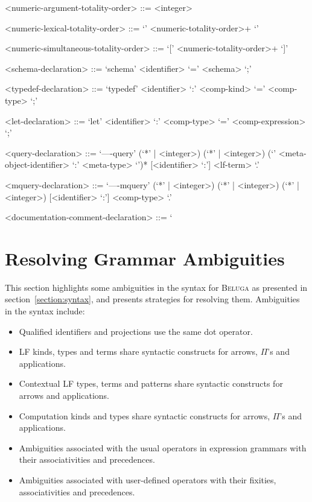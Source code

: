 \documentclass[11pt]{article}
\newcommand{\Beluga}{\textsc{Beluga}\xspace}
\newcommand{\LF}{\textsc{LF}\xspace}
\begin{document}
\begin{grammar}
<numeric-argument-totality-order> ::= <integer>

<numeric-lexical-totality-order> ::= `{' <numeric-totality-order>+ `}'

<numeric-simultaneous-totality-order> ::= `[' <numeric-totality-order>+ `]'

<schema-declaration> ::= `schema' <identifier> `=' <schema> `;'

<typedef-declaration> ::= `typedef' <identifier> `:' <comp-kind> `=' <comp-type> `;'

<let-declaration> ::= `let' <identifier> `:' <comp-type> `=' <comp-expression> `;'

<query-declaration> ::= `----query' (`*' | <integer>) (`*' | <integer>) (`{' <meta-object-identifier> `:' <meta-type> `}')* [<identifier> `:'] <lf-term> `.'

<mquery-declaration> ::= `----mquery' (`*' | <integer>) (`*' | <integer>) (`*' | <integer>) [<identifier> `:'] <comp-type> `.'

<documentation-comment-declaration> ::= `%
\end{grammar}

\section{Resolving Grammar Ambiguities}\label{section:resolving-grammar-ambiguities}

This section highlights some ambiguities in the syntax for \Beluga as presented in section~\ref{section:syntax}, and presents strategies for resolving them.
Ambiguities in the syntax include:
\begin{itemize}
\item Qualified identifiers and projections use the same dot operator.
\item \LF kinds, types and terms share syntactic constructs for arrows, $ \Pi $'s and applications.
\item Contextual \LF types, terms and patterns share syntactic constructs for arrows and applications.
\item Computation kinds and types share syntactic constructs for arrows, $ \Pi $'s and applications.
\item Ambiguities associated with the usual operators in expression grammars with their associativities and precedences.
\item Ambiguities associated with user-defined operators with their fixities, associativities and precedences.
\end{itemize}
\end{document}
